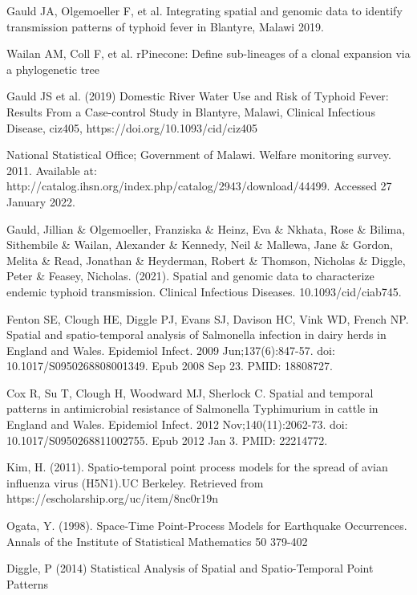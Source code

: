 \documentclass[a4paper]{thesis}
\begin{document}
\begin{thebibliography}{99}
\newpage

 Gauld JA, Olgemoeller F, et al. Integrating spatial and genomic data to identify transmission patterns of typhoid fever in Blantyre, Malawi 2019.

 Wailan AM, Coll F, et al. rPinecone: Define sub-lineages of a clonal expansion via a phylogenetic tree

 Gauld JS et al. (2019) Domestic River Water Use and Risk of Typhoid Fever: Results From a Case-control Study in Blantyre, Malawi, Clinical Infectious Disease, ciz405, https://doi.org/10.1093/cid/ciz405

 National Statistical Office; Government of Malawi. Welfare monitoring survey. 2011. Available at: http://catalog.ihsn.org/index.php/catalog/2943/download/44499. Accessed 27 January 2022.

 Gauld, Jillian \& Olgemoeller, Franziska \& Heinz, Eva \& Nkhata, Rose \& Bilima, Sithembile \& Wailan, Alexander \& Kennedy, Neil \& Mallewa, Jane \& Gordon, Melita \& Read, Jonathan \& Heyderman, Robert \& Thomson, Nicholas \& Diggle, Peter \& Feasey, Nicholas. (2021). Spatial and genomic data to characterize endemic typhoid transmission. Clinical Infectious Diseases. 10.1093/cid/ciab745. 

 Fenton SE, Clough HE, Diggle PJ, Evans SJ, Davison HC, Vink WD, French NP. Spatial and spatio-temporal analysis of Salmonella infection in dairy herds in England and Wales. Epidemiol Infect. 2009 Jun;137(6):847-57. doi: 10.1017/S0950268808001349. Epub 2008 Sep 23. PMID: 18808727.

 Cox R, Su T, Clough H, Woodward MJ, Sherlock C. Spatial and temporal patterns in antimicrobial resistance of Salmonella Typhimurium in cattle in England and Wales. Epidemiol Infect. 2012 Nov;140(11):2062-73. doi: 10.1017/S0950268811002755. Epub 2012 Jan 3. PMID: 22214772.

 Kim, H. (2011). Spatio-temporal point process models for the spread of avian inﬂuenza virus (H5N1).UC Berkeley. Retrieved from https://escholarship.org/uc/item/8nc0r19n

\newpage

 Ogata, Y. (1998). Space-Time Point-Process Models for Earthquake Occurrences. Annals of the Institute of Statistical Mathematics 50 379-402

 Diggle, P (2014) Statistical Analysis of Spatial and Spatio-Temporal Point Patterns


\end{thebibliography}
\end{document}
